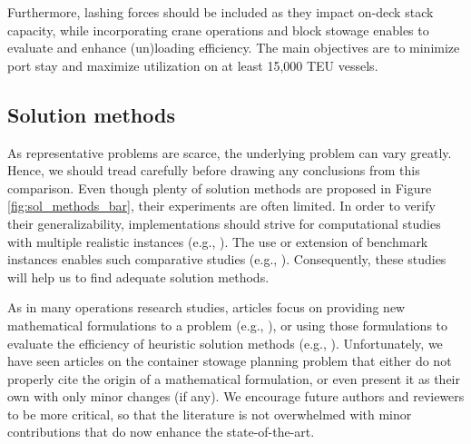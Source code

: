 \documentclass[preprint,12pt,authoryear]{elsarticle}
\begin{document}
Furthermore, lashing forces should be included as they impact on-deck stack capacity, while incorporating crane operations and block stowage enables to evaluate and enhance (un)loading efficiency. The main objectives are to minimize port stay and maximize utilization on at least 15,000 TEU vessels.

\subsection{Solution methods}
As representative problems are scarce, the underlying problem can vary greatly. Hence, we should tread carefully before drawing any conclusions from this comparison. Even though plenty of solution methods are proposed in Figure \ref{fig:sol_methods_bar}, their experiments are often limited. In order to verify their generalizability, implementations should strive for computational studies with multiple realistic instances (e.g., \cite{Kang2002StowageTransportation, Pacino2011FastVessels, Parreno-Torres2019SolutionProblem}). The use or extension of benchmark instances enables such comparative studies (e.g., \cite{Avriel1998StowageShifts, Ding2015StowageShifts, Larsen2021AProblem}). Consequently, these studies will help us to find adequate solution methods.  
 
As in many operations research studies, articles focus on providing new mathematical formulations to a problem (e.g., \cite{Botter1992StowageSolution, Ambrosino2004StowingProblem, Delgado2012ABays}), or using those formulations to evaluate the efficiency of heuristic solution methods (e.g., \cite{Ambrosino2010AnProblem, Pacino2013AnPlanning, Korach2020MatheuristicsBays}). Unfortunately, we have seen articles on the container stowage planning problem that either do not properly cite the origin of a mathematical formulation, or even present it as their own with only minor changes (if any). We encourage future authors and reviewers to be more critical, so that the literature is not overwhelmed with minor contributions that do now enhance the state-of-the-art.

\end{document}
